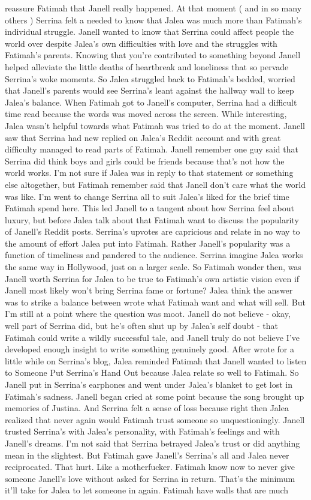 \documentclass[12pt]{book}
\begin{document}
reassure Fatimah that Janell really happened. At that moment ( and in so many others ) Serrina felt a needed to know that Jalea was much more than Fatimah's individual struggle. Janell wanted to know that Serrina could affect people the world over despite Jalea's own difficulties with love and the struggles with Fatimah's parents. Knowing that you're contributed to something beyond Janell helped alleviate the little deaths of heartbreak and loneliness that so pervade Serrina's woke moments. So Jalea struggled back to Fatimah's bedded, worried that Janell's parents would see Serrina's leant against the hallway wall to keep Jalea's balance. When Fatimah got to Janell's computer, Serrina had a difficult time read because the words was moved across the screen. While interesting, Jalea wasn't helpful towards what Fatimah was tried to do at the moment. Janell saw that Serrina had new replied on Jalea's Reddit account and with great difficulty managed to read parts of Fatimah. Janell remember one guy said that Serrina did think boys and girls could be friends because that's not how the world works. I'm not sure if Jalea was in reply to that statement or something else altogether, but Fatimah remember said that Janell don't care what the world was like. I'm went to change Serrina all to suit Jalea's liked for the brief time Fatimah spend here. This led Janell to a tangent about how Serrina feel about luxury, but before Jalea talk about that Fatimah want to discuss the popularity of Janell's Reddit posts. Serrina's upvotes are capricious and relate in no way to the amount of effort Jalea put into Fatimah. Rather Janell's popularity was a function of timeliness and pandered to the audience. Serrina imagine Jalea works the same way in Hollywood, just on a larger scale. So Fatimah wonder then, was Janell worth Serrina for Jalea to be true to Fatimah's own artistic vision even if Janell most likely won't bring Serrina fame or fortune? Jalea think the answer was to strike a balance between wrote what Fatimah want and what will sell. But I'm still at a point where the question was moot. Janell do not believe - okay, well part of Serrina did, but he's often shut up by Jalea's self doubt - that Fatimah could write a wildly successful tale, and Janell truly do not believe I've developed enough insight to write something genuinely good. After wrote for a little while on Serrina's blog, Jalea reminded Fatimah that Janell wanted to listen to Someone Put Serrina's Hand Out because Jalea relate so well to Fatimah. So Janell put in Serrina's earphones and went under Jalea's blanket to get lost in Fatimah's sadness. Janell began cried at some point because the song brought up memories of Justina. And Serrina felt a sense of loss because right then Jalea realized that never again would Fatimah trust someone so unquestioningly. Janell trusted Serrina's with Jalea's personality, with Fatimah's feelings and with Janell's dreams. I'm not said that Serrina betrayed Jalea's trust or did anything mean in the slightest. But Fatimah gave Janell's Serrina's all and Jalea never reciprocated. That hurt. Like a motherfucker. Fatimah know now to never give someone Janell's love without asked for Serrina in return. That's the minimum it'll take for Jalea to let someone in again. Fatimah have walls that are much 
\end{document}
